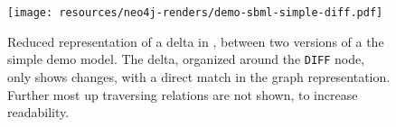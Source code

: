 \begin{figure}
	\centering
	\texttt{[image: resources/neo4j-renders/demo-sbml-simple-diff.pdf]}
	\caption[Reduced representation of a delta in \masymos, between two versions of a the simple \sbml demo model]{Reduced representation of a delta in \masymos, between two versions of a the simple \sbml demo model. The delta, organized around the \texttt{DIFF} node, only shows changes, with a direct match in the graph representation. Further most up traversing relations are not shown, to increase readability.}
	\label{fig:results:simple-diff}
\end{figure}